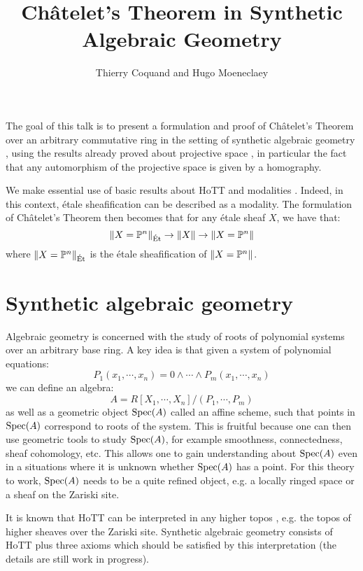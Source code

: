 \documentclass{../util/zariski}
\title{Ch\^atelet's Theorem in Synthetic Algebraic Geometry}
\author{Thierry Coquand and Hugo Moeneclaey}
\begin{document}
\maketitle

The goal of this talk is to present a formulation and proof of Ch\^atelet's Theorem over an arbitrary commutative ring
in the setting of synthetic algebraic geometry \cite{draft}, using the results already proved about projective
space \cite{sag-projective}, in particular the fact that any automorphism of the projective space is given
by a homography. 

We make essential use of basic results about HoTT \cite{hott}
and modalities \cite{modalities}. Indeed, in this context, \'etale sheafification can be described
as a modality. The formulation of Ch\^atelet's Theorem then becomes that for any étale sheaf $X$, we have that:
\[\lVert X=\mathbb{P}^n \rVert_{\mathrm{\acute{E}t}} \to \lVert X \rVert \to \lVert X=\mathbb{P}^n \rVert\]
where $\lVert X=\mathbb{P}^n \rVert_{\mathrm{\acute{E}t}}$ is the étale sheafification of $\lVert X=\mathbb{P}^n \rVert$.


\section{Synthetic algebraic geometry}

Algebraic geometry is concerned with the study of roots of polynomial systems over an arbitrary base ring. A key idea is that given a system of polynomial equations:
\[P_1(x_1,\cdots,x_n)=0\land\cdots\land P_m(x_1,\cdots,x_n)\]
we can define an algebra:
\[A = R[X_1,\cdots,X_n]/(P_1,\cdots,P_m)\]
as well as a geometric object $\operatorname{Spec}(A)$ called an affine scheme, such that points in $\operatorname{Spec}(A)$ correspond to roots of the system. This is fruitful because one can then use geometric tools to study $\operatorname{Spec}(A)$, for example smoothness, connectedness, sheaf cohomology, etc. This allows one to gain understanding about $\operatorname{Spec}(A)$ even in a situations where it is unknown whether $\operatorname{Spec}(A)$ has a point. For this theory to work, $\operatorname{Spec}(A)$ needs to be a quite refined object, e.g. a locally ringed space or a sheaf on the Zariski site.

It is known that HoTT can be interpreted in any higher topos \cite{shulman2019all}, e.g. the topos of higher sheaves over the Zariski site. Synthetic algebraic geometry consists of HoTT plus three axioms which should be satisfied by this interpretation (the details are still work in progress).
\end{document}

